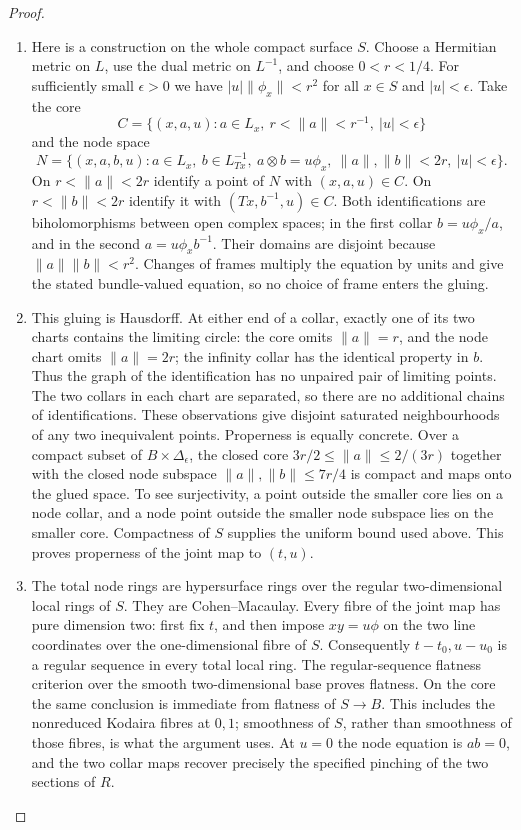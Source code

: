 \begin{proof}
\begin{enumerate}[label=\arabic*.,leftmargin=*]
\item Here is a construction on the whole compact surface $S$. Choose a
Hermitian metric on $L$, use the dual metric on $L^{-1}$, and choose
$0<r<1/4$. For sufficiently small $\epsilon>0$ we have
$|u|\|\phi_x\|<r^2$ for all $x\in S$ and $|u|<\epsilon$.
Take the core
\[
 C=\{(x,a,u):a\in L_x,\ r<\|a\|<r^{-1},\ |u|<\epsilon\}
\]
and the node space
\[
 N=\{(x,a,b,u):a\in L_x,\ b\in L^{-1}_{Tx},\
 a\otimes b=u\phi_x,\ \|a\|,\|b\|<2r,\ |u|<\epsilon\}.
\]
On $r<\|a\|<2r$ identify a point of $N$ with $(x,a,u)\in C$.
On $r<\|b\|<2r$ identify it with $(Tx,b^{-1},u)\in C$.
Both identifications are biholomorphisms between open complex spaces;
in the first collar $b=u\phi_x/a$, and in the second
$a=u\phi_xb^{-1}$. Their domains are disjoint because
$\|a\|\|b\|<r^2$. Changes of frames multiply the equation by
units and give the stated bundle-valued equation, so no choice of
frame enters the gluing.

\item This gluing is Hausdorff. At either end of a collar, exactly one
of its two charts contains the limiting circle: the core omits
$\|a\|=r$, and the node chart omits $\|a\|=2r$; the infinity
collar has the identical property in $b$. Thus the graph of the
identification has no unpaired pair of limiting points. The two
collars in each chart are separated, so there are no additional
chains of identifications. These observations give disjoint
saturated neighbourhoods of any two inequivalent points. Properness
is equally concrete. Over a compact subset of $B\times\Delta_\epsilon$,
the closed core $3r/2\leq\|a\|\leq2/(3r)$ together with the
closed node subspace $\|a\|,\|b\|\leq7r/4$ is compact and maps
onto the glued space. To see surjectivity, a point outside the smaller
core lies on a node collar, and a node point outside the smaller
node subspace lies on the smaller core. Compactness of $S$ supplies
the uniform bound used above. This proves properness of the joint
map to $(t,u)$.

\item The total node rings are hypersurface rings over the regular
two-dimensional local rings of $S$. They are Cohen--Macaulay.
Every fibre of the joint map has pure dimension two: first fix
$t$, and then impose $xy=u\phi$ on the two line coordinates over
the one-dimensional fibre of $S$. Consequently $t-t_0,u-u_0$ is a
regular sequence in every total local ring. The regular-sequence
flatness criterion over the smooth two-dimensional base proves
flatness. On the core the same conclusion is immediate from
flatness of $S\to B$. This includes the nonreduced Kodaira fibres
at $0,1$; smoothness of $S$, rather than smoothness of those fibres,
is what the argument uses. At $u=0$ the node equation is $ab=0$,
and the two collar maps recover precisely the specified pinching
of the two sections of $R$.


\end{enumerate}
\end{proof}
